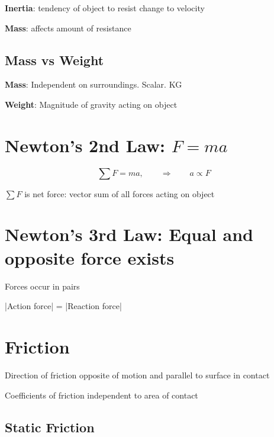 \documentclass[12pt]{article}
\begin{document}
\begin{spacing}{1.5}
\begin{itemize*}
	\item \textbf{Inertia}: tendency of object to resist change to velocity
	\item \textbf{Mass}: affects amount of resistance
\end{itemize*}

\subsection{Mass vs Weight}

\begin{itemize*}
	\item \textbf{Mass}: Independent on surroundings. Scalar. KG
	\item \textbf{Weight}: Magnitude of gravity acting on object
\end{itemize*}

\section{Newton's 2nd Law: $F=ma$}

$$\sum F = ma, \qquad \Rightarrow \qquad a \propto F$$

$\sum F$ is net force: vector sum of all forces acting on object

\section{Newton's 3rd Law: Equal and opposite force exists}

\begin{itemize*}
	\item Forces occur in pairs
	\item |Action force| = |Reaction force|
\end{itemize*}

\section{Friction}

\begin{itemize*}
	\item Direction of friction opposite of motion and parallel to surface in contact
	\item Coefficients of friction independent to area of contact
\end{itemize*}

\subsection{Static Friction}


\end{spacing}
\end{document}
